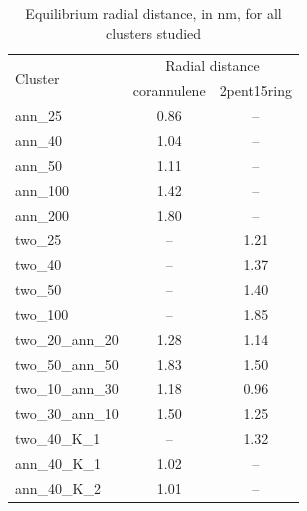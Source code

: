 %
\begin{table}[]
\centering
\caption{Equilibrium radial distance, in nm, for all clusters studied}
\begin{tabular}{lcc}
\hline
\multicolumn{1}{l}{\multirow{2}{*}{Cluster}} & \multicolumn{2}{c}{Radial distance} \\ 
\multicolumn{1}{c}{} & \multicolumn{1}{c}{corannulene} & \multicolumn{1}{c}{2pent15ring} \\ \hline
ann\_25 & \multicolumn{1}{c}{0.86} & -- \\
ann\_40 & \multicolumn{1}{c}{1.04} & -- \\
ann\_50 & \multicolumn{1}{c}{1.11} & -- \\
ann\_100 & \multicolumn{1}{c}{1.42} & -- \\
ann\_200 & \multicolumn{1}{c}{1.80} & -- \\ \hline
two\_25 & \multicolumn{1}{c}{--} & 1.21 \\
two\_40 & \multicolumn{1}{c}{--} & 1.37 \\
two\_50 & \multicolumn{1}{c}{--} & 1.40 \\
two\_100 & \multicolumn{1}{c}{--} & 1.85 \\ \hline
two\_20\_ann\_20 & \multicolumn{1}{c}{1.28} & 1.14 \\
two\_50\_ann\_50 & \multicolumn{1}{c}{1.83} & 1.50 \\
two\_10\_ann\_30 & \multicolumn{1}{c}{1.18} & 0.96 \\
two\_30\_ann\_10 & \multicolumn{1}{c}{1.50} & 1.25 \\ \hline
two\_40\_K\_1 & \multicolumn{1}{c}{--} & 1.32 \\
ann\_40\_K\_1 & \multicolumn{1}{c}{1.02} & -- \\
ann\_40\_K\_2 & \multicolumn{1}{c}{1.01} & -- \\ \hline
\end{tabular}
\label{tableSI:radialdistances}
\end{table}
%

